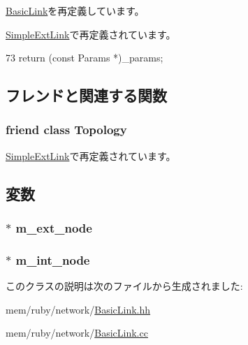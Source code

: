 \hyperlink{classBasicLink_acd3c3feb78ae7a8f88fe0f110a718dff}{BasicLink}を再定義しています。

\hyperlink{classSimpleExtLink_acd3c3feb78ae7a8f88fe0f110a718dff}{SimpleExtLink}で再定義されています。


\begin{DoxyCode}
73 { return (const Params *)_params; }
\end{DoxyCode}


\subsection{フレンドと関連する関数}
\hypertarget{classBasicExtLink_acd2b8699ab7559c0da687cd775e2c778}{
\subsubsection[{Topology}]{\setlength{\rightskip}{0pt plus 5cm}friend class {\bf Topology}}}
\label{classBasicExtLink_acd2b8699ab7559c0da687cd775e2c778}


\hyperlink{classSimpleExtLink_acd2b8699ab7559c0da687cd775e2c778}{SimpleExtLink}で再定義されています。

\subsection{変数}
\hypertarget{classBasicExtLink_a7c393355ad0c2633a9daf6d293426c97}{
\subsubsection[{m\_\-ext\_\-node}]{$\ast$ {\bf m\_\-ext\_\-node}}}
\label{classBasicExtLink_a7c393355ad0c2633a9daf6d293426c97}
\hypertarget{classBasicExtLink_aa88d834bd88ceb42e38634a4ff5b8df8}{
\subsubsection[{m\_\-int\_\-node}]{$\ast$ {\bf m\_\-int\_\-node}}}
\label{classBasicExtLink_aa88d834bd88ceb42e38634a4ff5b8df8}


このクラスの説明は次のファイルから生成されました:\begin{DoxyCompactItemize}
\item 
mem/ruby/network/\hyperlink{BasicLink_8hh}{BasicLink.hh}\item 
mem/ruby/network/\hyperlink{BasicLink_8cc}{BasicLink.cc}\end{DoxyCompactItemize}
